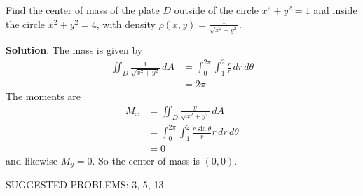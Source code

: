 \documentclass[10pt,]{book}
\theoremstyle{ptxplainnotitle}
\theoremstyle{ptxplaintitle}
\theoremstyle{ptxplainnotitle}
\theoremstyle{ptxplaintitle}
\theoremstyle{ptxplainnotitle}
\theoremstyle{ptxplaintitle}
\theoremstyle{ptxdefinitionnotitle}
\theoremstyle{ptxdefinitiontitle}
\theoremstyle{ptxdefinitionnotitle}
\theoremstyle{ptxdefinitiontitle}
\theoremstyle{ptxdefinitionnotitle}
\theoremstyle{ptxdefinitiontitle}
\theoremstyle{ptxdefinitionnotitle}
\theoremstyle{ptxdefinitiontitle}
\theoremstyle{ptxdefinitionnotitle}
\theoremstyle{ptxdefinitiontitle}
\numberwithin{equation}{section}
\begin{document}
\begin{example}\label{example-center-of-mass-of-an-annulus}
\hypertarget{p-1157}{}%
Find the center of mass of the plate \(D\) outside of the circle \(x^{2}+y^{2} = 1\) and inside the circle \(x^{2} + y^{2} = 4\), with density \(\rho(x,y) = \frac{1}{\sqrt{x^{2} + y^{2}}}\).%
\par\smallskip%
\noindent\textbf{Solution}.\hypertarget{solution-185}{}\quad%
\hypertarget{p-1158}{}%
The mass is given by%
\begin{align*}
\iint_{D} \frac{1}{\sqrt{x^{2}+y^{2}}}\,dA & = \int_{0}^{2\pi}\int_{1}^{2}\frac{r}{r}\,dr\,d\theta \\
& = 2\pi 
\end{align*}
The moments are%
\begin{align*}
M_{x} & = \iint_{D}\frac{y}{\sqrt{x^{2} + y^{2}}}\,dA \\
& = \int_{0}^{2\pi}\int_{1}^{2} \frac{r\sin\theta}{r}r\,dr\,d\theta \\
& = 0 
\end{align*}
and likewise \(M_{y} = 0\). So the center of mass is \((0,0)\).%
\end{example}
\bigbreak
\hypertarget{p-1159}{}%
SUGGESTED PROBLEMS: 3, 5, 13%
\typeout{************************************************}
\typeout{************************************************}
\end{document}
